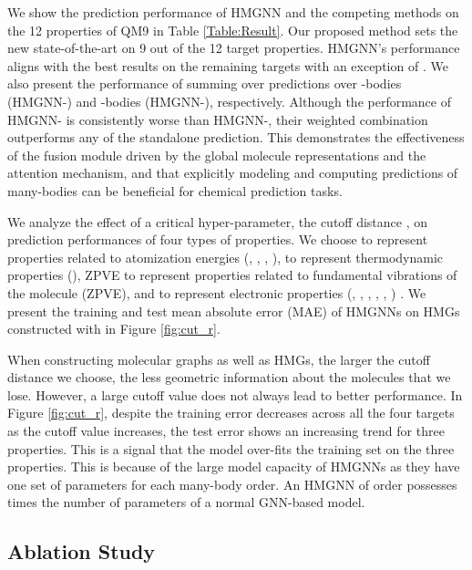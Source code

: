 \documentclass[conference]{IEEEtran}
\begin{document}
We show the prediction performance of HMGNN and the competing methods on the 12 properties of QM9 in Table \ref{Table:Result}. Our proposed method sets the new state-of-the-art on 9 out of the 12 target properties. HMGNN's performance aligns with the best results on the remaining targets with an exception of . We also present the performance of summing over predictions over -bodies (HMGNN-) and -bodies (HMGNN-), respectively. Although the performance of HMGNN- is consistently worse than HMGNN-, their weighted combination outperforms any of the standalone prediction. This demonstrates the effectiveness of the fusion module driven by the global molecule representations and the attention mechanism, and that explicitly modeling and computing predictions of many-bodies can be beneficial for chemical prediction tasks.

We analyze the effect of a critical hyper-parameter, the cutoff distance , on prediction performances of four types of properties. We choose  to represent properties related to atomization energies (, , , ),  to represent thermodynamic properties (), ZPVE to represent properties related to fundamental vibrations of the molecule (ZPVE), and  to represent electronic properties (, , , , , ) \cite{MPNN}. We present the training and test mean absolute error (MAE) of HMGNNs on HMGs constructed with  in Figure \ref{fig:cut_r}. 

When constructing molecular graphs as well as HMGs, the larger the cutoff distance we choose, the less geometric information about the molecules that we lose. However, a large cutoff value does not always lead to better performance. In Figure \ref{fig:cut_r}, despite the training error decreases across all the four targets as the cutoff value increases, the test error shows an increasing trend for three properties. This is a signal that the model over-fits the training set on the three properties. This is because of the large model capacity of HMGNNs as they have one set of parameters for each many-body order. An HMGNN of order  possesses  times the number of parameters of a normal GNN-based model. 



\subsection{Ablation Study}
\end{document}
